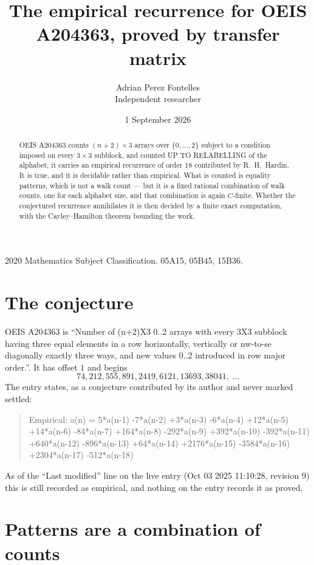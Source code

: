 \documentclass[11pt,a4paper]{article}
\title{The empirical recurrence for OEIS A204363, proved by transfer matrix}
\author{Adrian Perez Fontelles\\ \small Independent researcher}
\date{1 September 2026}
\theoremstyle{plain}
\theoremstyle{definition}
\begin{document}
\maketitle

\begin{abstract}
OEIS A204363 counts $(n+2)\times3$ arrays over $\{0,\dots,2\}$ subject to a condition imposed on
every $3\times3$ subblock, and counted UP TO RELABELLING of the
alphabet; it carries an empirical recurrence of order $18$ contributed by
R.~H.~Hardin. It is true, and it is decidable rather than empirical. What is counted is
equality patterns, which is not a walk count --- but it is a fixed rational combination of
walk counts, one for each alphabet size, and that combination is again $C$-finite. Whether the
conjectured recurrence annihilates it is then decided by a finite exact computation, with the
Cayley--Hamilton theorem bounding the work.
\end{abstract}

\noindent\small 2020 Mathematics Subject Classification. 05A15, 05B45, 15B36.\normalsize

\section{The conjecture}

OEIS A204363 is ``Number of (n+2)X3 0..2 arrays with every 3X3 subblock having three equal elements in a row horizontally, vertically or nw-to-se diagonally exactly three ways, and new values 0..2 introduced in row major order.''. It has offset $1$ and begins
\[
74, 212, 555, 891, 2419, 6121, 13693, 38041,\ \dots
\]
The entry states, as a conjecture contributed by its author and never marked settled:
\begin{quote}
Empirical: a(n) = 5*a(n-1) -7*a(n-2) +3*a(n-3) -6*a(n-4) +12*a(n-5) +14*a(n-6) -84*a(n-7) +164*a(n-8) -292*a(n-9) +392*a(n-10) -392*a(n-11) +640*a(n-12) -896*a(n-13) +64*a(n-14) +2176*a(n-15) -3584*a(n-16) +2304*a(n-17) -512*a(n-18)
\end{quote}
As of the ``Last modified'' line on the live entry (Oct 03 2025 11:10:28, revision 9) this is still
recorded as empirical, and nothing on the entry records it as proved.

\section{Patterns are a combination of counts}
\end{document}
